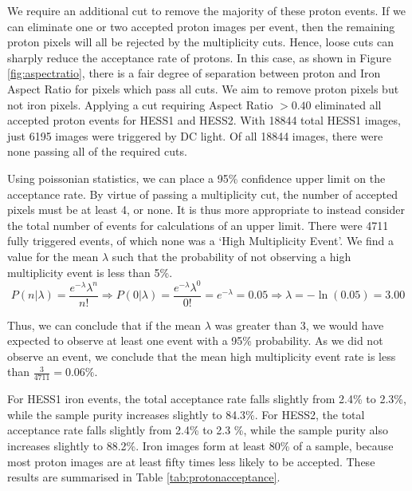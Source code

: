 \documentclass[11pt]{article}
\begin{document}
We require an additional cut to remove the majority of these proton events. If we can eliminate one or two accepted proton images per event, then the remaining proton pixels will all be rejected by the multiplicity cuts. Hence, loose cuts can sharply reduce the acceptance rate of protons. In this case, as shown in Figure \ref{fig:aspectratio}, there is a fair degree of separation between proton and Iron Aspect Ratio for pixels which pass all cuts. We aim to remove proton pixels but not iron pixels. Applying a cut requiring Aspect Ratio $> 0.40$ eliminated all accepted proton events for HESS1 and HESS2. With 18844 total HESS1 images, just 6195 images were triggered by DC light. Of all 18844 images, there were none passing all of the required cuts. 

Using poissonian statistics, we can place a 95\% confidence upper limit on the acceptance rate. By virtue of passing a multiplicity cut, the number of accepted pixels must be at least 4, or none. It is thus more appropriate to instead consider the total number of events for calculations of an upper limit. There were 4711 fully triggered events, of which none was a \textquoteleft High Multiplicity Event'. We find a value for the mean $\lambda$ such that the probability of not observing a high multiplicity event is less than 5\%.
\[ P(n|\lambda)=\frac{e^{-\lambda}\lambda^{n}}{n!} \Longrightarrow P(0|\lambda)=\frac{e^{-\lambda}\lambda^{0}}{0!}=e^{-\lambda}=0.05
\Longrightarrow
\lambda = -\ln(0.05)=3.00\]

Thus, we can conclude that if the mean $\lambda$ was greater than 3, we would have expected to observe at least one event with a 95\% probability. As we did not observe an event, we conclude that the mean high multiplicity event rate is less than $\frac{3}{4711}=0.06\%$. 

For HESS1 iron events, the total acceptance rate falls slightly from 2.4\% to 2.3\%, while the sample purity increases slightly to 84.3\%. For HESS2, the total acceptance rate falls slightly from 2.4\% to 2.3 \%, while the sample purity also increases slightly to 88.2\%. Iron images form at least 80\% of a sample, because most proton images are at least fifty times less likely to be accepted. These results are summarised in Table \ref{tab:protonacceptance}.
\end{document}
